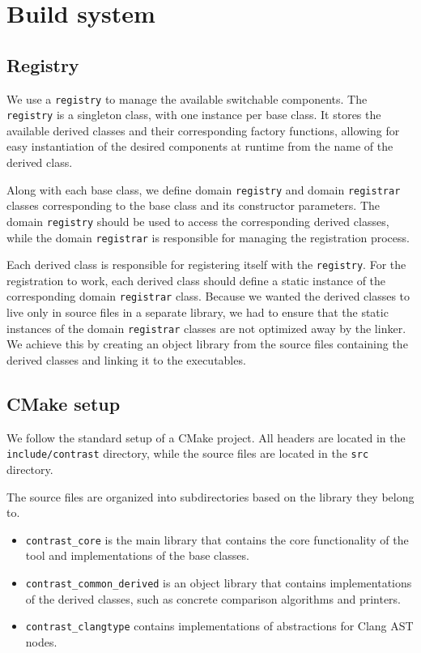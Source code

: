 \section{Build system}\label{sec:buildsystem}

\subsection{Registry}

We use a \texttt{registry} to manage the available switchable components.
The \texttt{registry} is a singleton class, with one instance per base class.
It stores the available derived classes and their corresponding factory functions, allowing for easy instantiation of the desired components at runtime from the name of the derived class.

Along with each base class, we define domain \texttt{registry} and domain \texttt{registrar} classes corresponding to the base class and its constructor parameters.
The domain \texttt{registry} should be used to access the corresponding derived classes, while the domain \texttt{registrar} is responsible for managing the registration process.

Each derived class is responsible for registering itself with the \texttt{registry}.
For the registration to work, each derived class should define a static instance of the corresponding domain \texttt{registrar} class.
Because we wanted the derived classes to live only in source files in a separate library, we had to ensure that the static instances of the domain \texttt{registrar} classes are not optimized away by the linker.
We achieve this by creating an object library from the source files containing the derived classes and linking it to the executables.

\subsection{CMake setup}

We follow the standard setup of a CMake project.
All headers are located in the \texttt{include/contrast} directory, while the source files are located in the \texttt{src} directory.

The source files are organized into subdirectories based on the library they belong to.
\begin{itemize}
\item \texttt{contrast\_core} is the main library that contains the core functionality of the tool and implementations of the base classes.
\item \texttt{contrast\_common\_derived} is an object library that contains implementations of the derived classes, such as concrete comparison algorithms and printers.
\item \texttt{contrast\_clangtype} contains implementations of abstractions for Clang AST nodes.
\end{itemize}

